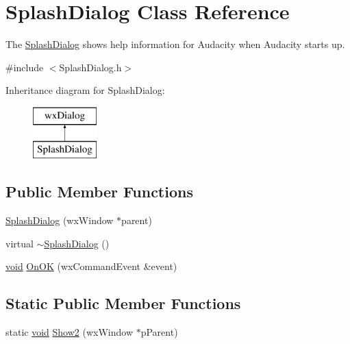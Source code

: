 \hypertarget{class_splash_dialog}{}\section{Splash\+Dialog Class Reference}
\label{class_splash_dialog}


The \hyperlink{class_splash_dialog}{Splash\+Dialog} shows help information for Audacity when Audacity starts up.  




{\ttfamily \#include $<$Splash\+Dialog.\+h$>$}

Inheritance diagram for Splash\+Dialog\+:\begin{figure}[H]
\begin{center}
\leavevmode
\includegraphics[height=2.000000cm]{class_splash_dialog}
\end{center}
\end{figure}
\subsection*{Public Member Functions}
\begin{DoxyCompactItemize}
\item 
\hyperlink{class_splash_dialog_a10047988a20be309d1417ab80d8a326d}{Splash\+Dialog} (wx\+Window $\ast$parent)
\item 
virtual \hyperlink{class_splash_dialog_a954a2adacc707dd0082ab09e95d99d36}{$\sim$\+Splash\+Dialog} ()
\item 
\hyperlink{sound_8c_ae35f5844602719cf66324f4de2a658b3}{void} \hyperlink{class_splash_dialog_a508c9800d9499de64b2a87f008e638d5}{On\+OK} (wx\+Command\+Event \&event)
\end{DoxyCompactItemize}
\subsection*{Static Public Member Functions}
\begin{DoxyCompactItemize}
\item 
static \hyperlink{sound_8c_ae35f5844602719cf66324f4de2a658b3}{void} \hyperlink{class_splash_dialog_a6a8171e04406fdde7e49e5fe6e7d28fc}{Show2} (wx\+Window $\ast$p\+Parent)
\end{DoxyCompactItemize}


